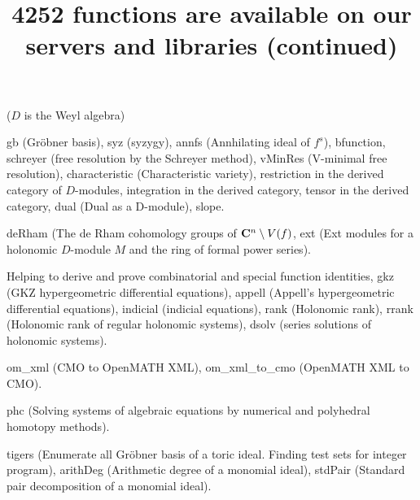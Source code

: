 \documentclass[twocolumn]{article}
\title{\huge \color{blue} 4252 functions are available
on our servers and libraries (continued)}
\author{} \date{}
\begin{document}
\maketitle

\noindent
{} ($D$ is the Weyl algebra)

\noindent
{\color{red} gb } (Gr\"obner basis),
{\color{red} syz} (syzygy),
{\color{red} annfs} (Annhilating ideal of $f^s$),
{\color{red} bfunction},
{\color{red} schreyer} (free resolution by the Schreyer method),
{\color{red} vMinRes} (V-minimal free resolution),
{\color{red} characteristic} (Characteristic variety),
{\color{red} restriction} in the derived category of $D$-modules,
{\color{red} integration} in the derived category,
{\color{red} tensor}  in the derived category,
{\color{red} dual} (Dual as a D-module),
{\color{red} slope}.

\medbreak
\noindent
{} 

\noindent
{\color{red} deRham} (The de Rham cohomology groups of
${\bf C}^n \setminus V(f)$,
{\color{red} ext} (Ext modules for a holonomic $D$-module $M$
and the ring of formal power series).

\medbreak
\noindent
{}

\noindent
Helping to derive and prove {\color{red} combinatorial} and
{\color{red} special function identities},
{\color{red} gkz} (GKZ hypergeometric differential equations),
{\color{red} appell} (Appell's hypergeometric differential equations),
{\color{red} indicial} (indicial equations),
{\color{red} rank} (Holonomic rank),
{\color{red} rrank} (Holonomic rank of regular holonomic systems),
{\color{red} dsolv} (series solutions of holonomic systems).

\medbreak
\noindent
{}

\noindent
{\color{red} om\_xml} (CMO to OpenMATH XML),
{\color{red} om\_xml\_to\_cmo} (OpenMATH XML to CMO).

\medbreak
\noindent
{}

\noindent
{\color{red} phc} (Solving systems of algebraic equations by 
numerical and polyhedral homotopy methods).

\medbreak
\noindent
{}

\noindent
{\color{red} tigers} (Enumerate all Gr\"obner basis of a toric ideal.
Finding test sets for integer program),
{\color{red} arithDeg} (Arithmetic degree of a monomial ideal),
{\color{red} stdPair} (Standard pair decomposition of a monomial ideal).
\end{document}
